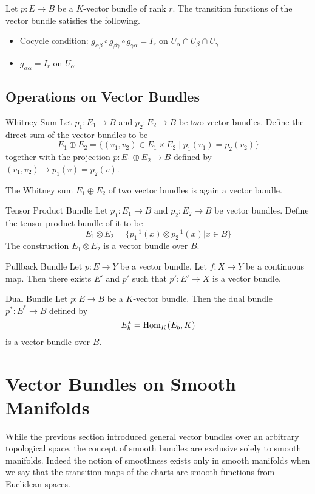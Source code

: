 \documentclass[a4paper]{article}
\begin{document}
\begin{prp}{}{} Let $p:E\to B$ be a $K$-vector bundle of rank $r$. The transition functions of the vector bundle satisfies the following. 
\begin{itemize}
\item Cocycle condition: $g_{\alpha\beta}\circ g_{\beta\gamma}\circ g_{\gamma\alpha}=I_r$ on $U_\alpha\cap U_\beta\cap U_\gamma$
\item $g_{\alpha\alpha}=I_r$ on $U_\alpha$
\end{itemize}
\end{prp}

\subsection{Operations on Vector Bundles}
\begin{defn}{Whitney Sum}{} Let $p_1:E_1\to B$ and $p_2:E_2\to B$ be two vector bundles. Define the direct sum of the vector bundles to be $$E_1\oplus E_2=\{(v_1,v_2)\in E_1\times E_2\;|\;p_1(v_1)=p_2(v_2)\}$$ together with the projection $p:E_1\oplus E_2\to B$ defined by $(v_1,v_2)\mapsto p_1(v)=p_2(v)$. 
\end{defn}

\begin{lmm}{}{} The Whitney sum $E_1\oplus E_2$ of two vector bundles is again a vector bundle. 
\end{lmm}

\begin{prp}{Tensor Product Bundle}{} Let $p_1:E_1\to B$ and $p_2:E_2\to B$ be vector bundles. Define the tensor product bundle of it to be $$E_1\otimes E_2=\{p_1^{-1}(x)\otimes p_2^{-1}(x)|x\in B\}$$ The construction $E_1\otimes E_2$ is a vector bundle over $B$. 
\end{prp}

\begin{thm}{Pullback Bundle}{} Let $p:E\to Y$ be a vector bundle. Let $f:X\to Y$ be a continuous map. Then there exists $E'$ and $p'$ such that $p':E'\to X$ is a vector bundle. 
\end{thm}

\begin{thm}{Dual Bundle}{} Let $p:E\to B$ be a $K$-vector bundle. Then the dual bundle $p^\ast:E^\ast\to B$ defined by $$E_b^\ast=\operatorname{Hom}_K(E_b,K)$$ is a vector bundle over $B$. 
\end{thm}

\pagebreak
\section{Vector Bundles on Smooth Manifolds}
While the previous section introduced general vector bundles over an arbitrary topological space, the concept of smooth bundles are exclusive solely to smooth manifolds. Indeed the notion of smoothness exists only in smooth manifolds when we say that the transition maps of the charts are smooth functions from Euclidean spaces. 
\end{document}
